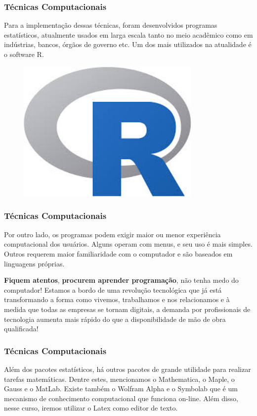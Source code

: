 \documentclass[14pt,aspectratio=1610]{beamer}
\begin{document}
\begin{frame}{}
\frametitle{Técnicas Computacionais}
\begin{block}{}
\justifying
Para a implementação dessas técnicas, foram desenvolvidos programas estatísticos, atualmente usados em larga escala tanto no meio acadêmico como em indústrias, 
bancos, órgãos de governo etc. Um dos mais utilizados na atualidade é o software R.
\end{block}
\begin{figure}[H]
    \centering
    \includegraphics[height=0.3\textwidth, width=0.8\textwidth]{download}
  \end{figure}
\end{frame}

\begin{frame}{}
\frametitle{Técnicas Computacionais}
\begin{block}{}
\justifying
Por outro lado, os programas podem exigir maior ou menor experiência computacional dos usuários. Alguns operam com menus, e seu uso é mais simples. Outros 
requerem maior familiaridade com o computador e são baseados em linguagens próprias. 
\end{block}
\begin{block}{}
\textbf{Fiquem atentos}, \textbf{procurem aprender programação}, não tenha medo do computador! Estamos a bordo de uma revolução tecnológica que já está transformando 
a forma como vivemos, trabalhamos e nos relacionamos e à medida que todas as empresas se tornam digitais, a demanda por profissionais de tecnologia aumenta 
mais rápido do que a disponibilidade de mão de obra qualificada!
\end{block}
\end{frame}

\begin{frame}{}
\frametitle{Técnicas Computacionais}
\begin{block}{}
\justifying
Além dos pacotes estatísticos, há outros pacotes de grande utilidade para realizar tarefas matemáticas. Dentre estes, mencionamos o Mathematica, o Maple, o Gauss 
e o MatLab. Existe também o Wolfram Alpha e o Symbolab que é um mecanismo de conhecimento computacional que funciona on-line. Além disso, nesse curso, iremos 
utilizar o Latex como editor de texto.
\end{block}
\end{frame}
\end{document}

